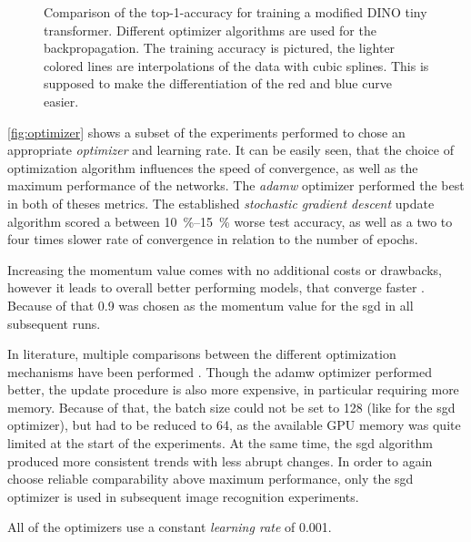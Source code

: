 \begin{figure}[htbp]
    \centering
    \caption{Comparison of the top-1-accuracy for training a modified DINO tiny transformer.
    Different optimizer algorithms are used for the backpropagation.
    The training accuracy is pictured, the lighter colored lines are interpolations of the data with cubic splines. 
    This is supposed to make the differentiation of the red and blue curve easier.
    }
    \label{fig:optimizer}
\end{figure}

\autoref{fig:optimizer} shows a subset of the experiments performed to chose an appropriate \emph{optimizer} and learning rate.
It can be easily seen, that the choice of optimization algorithm influences the speed of convergence, as well as the maximum performance of the networks.
The \emph{adamw} \cite{adamwOptimizer} optimizer performed the best in both of theses metrics.
The established \emph{stochastic gradient descent} update algorithm scored a between \SIrange[]{10}{15}{\percent} worse test accuracy, as well as a two to four times slower rate of convergence in relation to the number of epochs.

Increasing the momentum value comes with no additional costs or drawbacks, however it leads to overall better performing models, that converge faster \cite{momentum}.
Because of that \SI{0.9}{} was chosen as the momentum value for the sgd in all subsequent runs.

In literature, multiple comparisons between the different optimization mechanisms have been performed \cite{sgdOrAdamw}.
Though the adamw optimizer performed better, the update procedure is also more expensive, in particular requiring more memory.
Because of that, the batch size could not be set to 128 (like for the sgd optimizer), but had to be reduced to 64, as the available GPU memory was quite limited at the start of the experiments.
At the same time, the sgd algorithm produced more consistent trends with less abrupt changes.
In order to again choose reliable comparability above maximum performance, only the sgd optimizer is used in subsequent image recognition experiments. 

All of the optimizers use a constant \emph{learning rate} of \SI[]{0.001}{}{}.